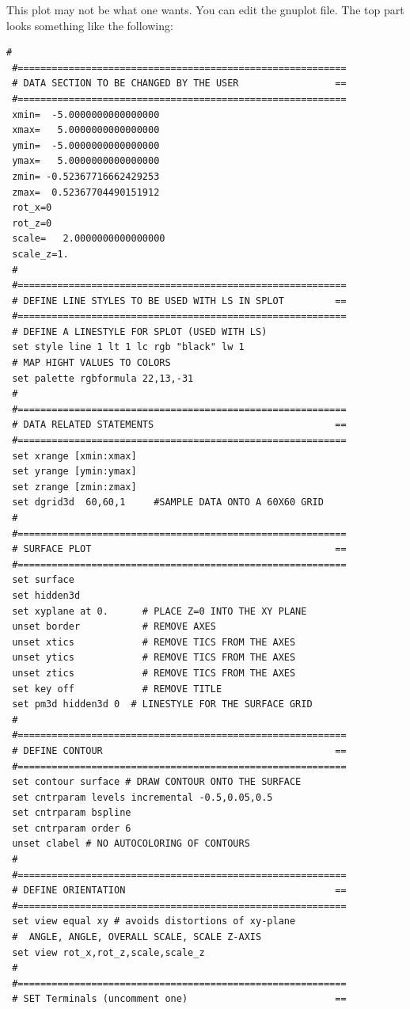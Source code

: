 \documentclass[final,12pt]{article}
\begin{document}
{{{{{{This plot may not be what one wants. You can edit the gnuplot
file. The top part looks something like the following: 
{\tiny\begin{verbatim}
#
 #==========================================================
 # DATA SECTION TO BE CHANGED BY THE USER                 ==
 #==========================================================
 xmin=  -5.0000000000000000     
 xmax=   5.0000000000000000     
 ymin=  -5.0000000000000000     
 ymax=   5.0000000000000000     
 zmin= -0.52367716662429253     
 zmax=  0.52367704490151912     
 rot_x=0
 rot_z=0
 scale=   2.0000000000000000     
 scale_z=1.
 #
 #==========================================================
 # DEFINE LINE STYLES TO BE USED WITH LS IN SPLOT         ==
 #==========================================================
 # DEFINE A LINESTYLE FOR SPLOT (USED WITH LS)
 set style line 1 lt 1 lc rgb "black" lw 1
 # MAP HIGHT VALUES TO COLORS
 set palette rgbformula 22,13,-31
 #
 #==========================================================
 # DATA RELATED STATEMENTS                                ==
 #==========================================================
 set xrange [xmin:xmax]
 set yrange [ymin:ymax]
 set zrange [zmin:zmax]
 set dgrid3d  60,60,1     #SAMPLE DATA ONTO A 60X60 GRID
 #
 #==========================================================
 # SURFACE PLOT                                           ==
 #==========================================================
 set surface
 set hidden3d
 set xyplane at 0.      # PLACE Z=0 INTO THE XY PLANE
 unset border           # REMOVE AXES
 unset xtics            # REMOVE TICS FROM THE AXES
 unset ytics            # REMOVE TICS FROM THE AXES
 unset ztics            # REMOVE TICS FROM THE AXES
 set key off            # REMOVE TITLE
 set pm3d hidden3d 0  # LINESTYLE FOR THE SURFACE GRID
 #
 #==========================================================
 # DEFINE CONTOUR                                         ==
 #==========================================================
 set contour surface # DRAW CONTOUR ONTO THE SURFACE
 set cntrparam levels incremental -0.5,0.05,0.5
 set cntrparam bspline
 set cntrparam order 6
 unset clabel # NO AUTOCOLORING OF CONTOURS
 #
 #==========================================================
 # DEFINE ORIENTATION                                     ==
 #==========================================================
 set view equal xy # avoids distortions of xy-plane
 #  ANGLE, ANGLE, OVERALL SCALE, SCALE Z-AXIS
 set view rot_x,rot_z,scale,scale_z
 #
 #==========================================================
 # SET Terminals (uncomment one)                          ==

\end{verbatim}}}}}}}}
\end{document}
